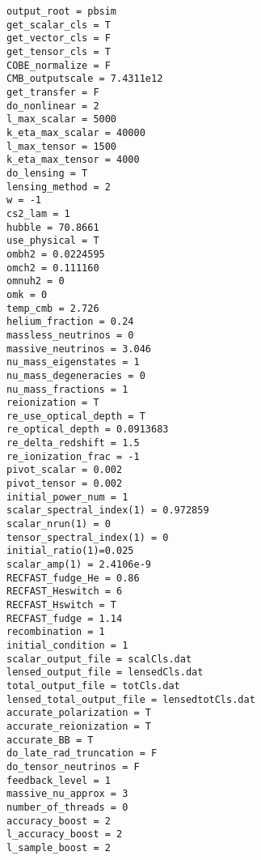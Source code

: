 \documentclass[12pt]{report}
\begin{document}
\chapter{}

\\\\
\\\\
\\\\
\\\\


\nocite{*}





\twocolumn

\appendix
\chapter{}
\begin{verbatim}
output_root = pbsim
get_scalar_cls = T
get_vector_cls = F
get_tensor_cls = T
COBE_normalize = F
CMB_outputscale = 7.4311e12
get_transfer = F
do_nonlinear = 2
l_max_scalar = 5000
k_eta_max_scalar = 40000
l_max_tensor = 1500
k_eta_max_tensor = 4000
do_lensing = T
lensing_method = 2
w = -1
cs2_lam = 1
hubble = 70.8661
use_physical = T
ombh2 = 0.0224595
omch2 = 0.111160
omnuh2 = 0
omk = 0
temp_cmb = 2.726
helium_fraction = 0.24
massless_neutrinos = 0
massive_neutrinos = 3.046
nu_mass_eigenstates = 1
nu_mass_degeneracies = 0
nu_mass_fractions = 1
reionization = T
re_use_optical_depth = T
re_optical_depth = 0.0913683
re_delta_redshift = 1.5
re_ionization_frac = -1
pivot_scalar = 0.002
pivot_tensor = 0.002
initial_power_num = 1
scalar_spectral_index(1) = 0.972859
scalar_nrun(1) = 0
tensor_spectral_index(1) = 0
initial_ratio(1)=0.025
scalar_amp(1) = 2.4106e-9
RECFAST_fudge_He = 0.86
RECFAST_Heswitch = 6
RECFAST_Hswitch = T
RECFAST_fudge = 1.14
recombination = 1
initial_condition = 1
scalar_output_file = scalCls.dat
lensed_output_file = lensedCls.dat
total_output_file = totCls.dat
lensed_total_output_file = lensedtotCls.dat
accurate_polarization = T
accurate_reionization = T
accurate_BB = T
do_late_rad_truncation = F
do_tensor_neutrinos = F
feedback_level = 1
massive_nu_approx = 3
number_of_threads = 0
accuracy_boost = 2
l_accuracy_boost = 2
l_sample_boost = 2
\end{verbatim}
\end{document}
